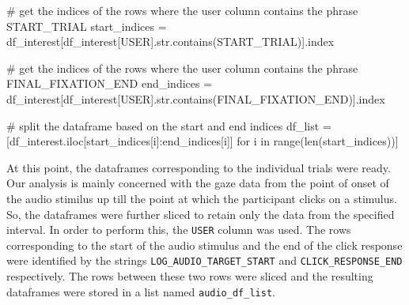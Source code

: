 \documentclass[
  a4paper,
]{article}
\newenvironment{Shaded}{}{}
\newcommand{\BuiltInTok}[1]{\textcolor[rgb]{0.84,0.23,0.29}{#1}}
\newcommand{\CommentTok}[1]{\textcolor[rgb]{0.42,0.45,0.49}{#1}}
\newcommand{\ControlFlowTok}[1]{\textcolor[rgb]{0.84,0.23,0.29}{#1}}
\newcommand{\KeywordTok}[1]{\textcolor[rgb]{0.84,0.23,0.29}{#1}}
\newcommand{\NormalTok}[1]{\textcolor[rgb]{0.14,0.16,0.18}{#1}}
\newcommand{\OperatorTok}[1]{\textcolor[rgb]{0.14,0.16,0.18}{#1}}
\newcommand{\StringTok}[1]{\textcolor[rgb]{0.01,0.18,0.38}{#1}}
\begin{document}
\begin{Shaded}
\begin{Highlighting}[]
\CommentTok{\# get the indices of the rows where the user column contains the phrase \textquotesingle{}START\_TRIAL\textquotesingle{}}
\NormalTok{start\_indices }\OperatorTok{=}\NormalTok{ df\_interest[df\_interest[}\StringTok{\textquotesingle{}USER\textquotesingle{}}\NormalTok{].}\BuiltInTok{str}\NormalTok{.contains(}\StringTok{\textquotesingle{}START\_TRIAL\textquotesingle{}}\NormalTok{)].index}

\CommentTok{\# get the indices of the rows where the user column contains the phrase \textquotesingle{}FINAL\_FIXATION\_END\textquotesingle{}}
\NormalTok{end\_indices }\OperatorTok{=}\NormalTok{ df\_interest[df\_interest[}\StringTok{\textquotesingle{}USER\textquotesingle{}}\NormalTok{].}\BuiltInTok{str}\NormalTok{.contains(}\StringTok{\textquotesingle{}FINAL\_FIXATION\_END\textquotesingle{}}\NormalTok{)].index}

\CommentTok{\# split the dataframe based on the start and end indices}
\NormalTok{df\_list }\OperatorTok{=}\NormalTok{ [df\_interest.iloc[start\_indices[i]:end\_indices[i]] }\ControlFlowTok{for}\NormalTok{ i }\KeywordTok{in} \BuiltInTok{range}\NormalTok{(}\BuiltInTok{len}\NormalTok{(start\_indices))]}
\end{Highlighting}
\end{Shaded}

At this point, the dataframes corresponding to the individual trials
were ready. Our analysis is mainly concerned with the gaze data from the
point of onset of the audio stimilus up till the point at which the
participant clicks on a stimulus. So, the dataframes were further sliced
to retain only the data from the specified interval. In order to perform
this, the \texttt{USER} column was used. The rows corresponding to the
start of the audio stimulus and the end of the click response were
identified by the strings \texttt{LOG\_AUDIO\_TARGET\_START} and
\texttt{CLICK\_RESPONSE\_END} respectively. The rows between these two
rows were sliced and the resulting dataframes were stored in a list
named \texttt{audio\_df\_list}.
\end{document}
